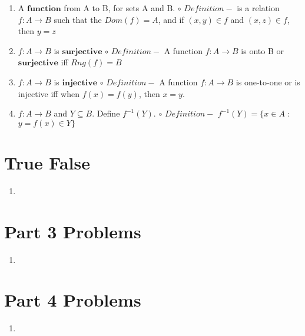 \documentclass[11pt]{article}
\begin{document}
\begin{enumerate}
    \item A $\mathbf{function}$ from A to B, for sets A and B.
        \newline $\circ$ $Definition - $ is a relation $f:A\rightarrow B$ such that the $Dom(f) = A$, and if $(x,y) \in f$ and $(x,z) \in f$, then $y=z$
    \item $f:A\rightarrow B$ is $\mathbf{surjective}$
        \newline $\circ$ $Definition - $ A function $f:A\rightarrow B$ is onto B or $\mathbf{surjective}$ iff $Rng(f) = B$
    \item $f:A\rightarrow B$ is $\mathbf{injective}$
        \newline $\circ$ $Definition - $ A function $f:A \rightarrow B$ is one-to-one or is injective iff when $f(x)=f(y)$, then $x=y$.
    \item $f:A\rightarrow B$ and $Y \subseteq B$. Define $f^{-1}(Y).$
        \newline $\circ$ $Definition - $ $f^{-1}(Y) = \{x \in A$ : $y=f(x) \in Y\}$
\end{enumerate}
\pagebreak

\section*{True False}
\begin{enumerate}
    \item 
\end{enumerate}
\pagebreak

\section{Part 3 Problems}
\begin{enumerate}
    \item 
\end{enumerate}
\pagebreak

\section{Part 4 Problems}
\begin{enumerate}
    \item 
\end{enumerate}
\pagebreak
\end{document}
